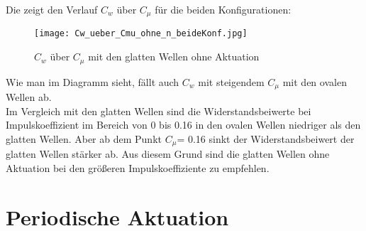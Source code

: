Die  zeigt den Verlauf $C_{w}$ \"uber $C_{\mu}$ f\"ur die beiden Konfigurationen:
\begin{figure}[h]
	\centering
	\texttt{[image: Cw\_ueber\_Cmu\_ohne\_n\_beideKonf.jpg]}
	\caption{$C_{w}$  \"uber $C_{\mu}$ mit den glatten Wellen ohne Aktuation }
	\label{fig:Cw-Cmu_Konf1+2}
\end{figure}

Wie man im Diagramm sieht, f\"allt auch $C_{w}$  mit steigendem $C_{\mu}$  mit den ovalen Wellen ab.
\\
Im Vergleich mit den glatten Wellen sind die Widerstandsbeiwerte bei Impulskoeffizient im Bereich von 0 bis 0.16  in den ovalen Wellen niedriger als den glatten Wellen. Aber ab dem Punkt $C_{\mu}$= 0.16 sinkt der Widerstandsbeiwert der glatten Wellen st\"arker ab. Aus diesem Grund sind die glatten Wellen ohne Aktuation bei den gr\"o\ss{}eren Impulskoeffiziente zu empfehlen.
    




\label{sec:ErgebnisseKonstanteAktuation}

\section{Periodische Aktuation}


